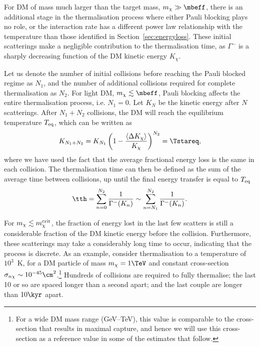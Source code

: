 For DM of mass much larger than the target mass, $m_\chi\gg \mbeff$, there is an additional stage in the thermalisation process where either Pauli blocking plays no role, or the interaction rate has a different power law relationship with the temperature than those identified in Section~\ref{sec:energyloss}. These initial scatterings make a negligible contribution to the thermalisation time, as  $\Gamma^{-}$ is a sharply decreasing function of the DM kinetic energy $K_\chi$. 

 
Let us denote the number of initial collisions before reaching the Pauli blocked regime as $N_1$, and the number of additional collisions required for complete thermalisation as $N_2$. For light DM, $m_\chi\lesssim \mbeff$, Pauli blocking affects the entire thermalisation process, i.e. $N_1=0$. Let $K_N$ be the kinetic energy after $N$ scatterings. After $N_1+N_2$ collisions, the DM will reach the equilibrium temperature $T_{\rm eq}$, which can be written as
\begin{equation}
K_{N_1+N_2} = 
K_{N_1}\left(1-\frac{\langle \Delta K_\chi \rangle}{K_\chi}\right)^{N_2} = \Tstareq,  
\label{eq:Teq}
\end{equation}
where we have used the fact that the average fractional energy loss is the same in each collision. 
The thermalisation time can then be defined as the sum of the average time between collisions, up until the final energy transfer is equal to $T_{\rm eq}$~\cite{Bertoni:2013bsa_dec_DarkMatterThermalization}
\begin{equation}
\tth = \sum_{n=0}^{N_2} \frac{1}{\Gamma^{-}(K_n)} \sim \sum_{n=N_1}^{N_2} \frac{1}{\Gamma^{-}(K_n)}.  
\label{eq:thermtime}
\end{equation}


For  $m_\chi \lesssim m_\chi^{\rm crit}$, the fraction of energy lost in the last few scatters is still a considerable fraction of the DM kinetic energy before the collision. Furthermore, these scatterings may take a considerably long time to occur, indicating that the process is discrete. 
As an example, consider thermalisation to a temperature of $10^3$~K, for a DM particle of mass $m_\chi=1\TeV$ and constant cross-section $\sigma_{n\chi} \sim 10^{-45}\cm^2$.\footnote{ For a wide DM mass range (GeV--TeV), this value is comparable to the cross-section that results in maximal capture, and hence we will use this cross-section as a reference value in some of the estimates that follow.} Hundreds of collisions are required to fully thermalise; the last 10 or so are spaced longer than a second apart; and the last couple are longer than $10 \kyr$ apart.    



